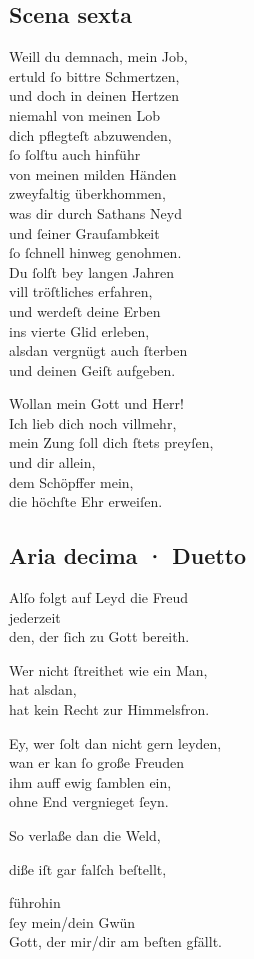 \documentclass{ees}
\newenvironment{lyrics}[1]{%
  \subsection{#1}\nopagebreak%
  \begin{lyricslist}%
  \let\voice\item%
}{%
  \end{lyricslist}%
}
\begin{document}
\begin{lyrics}{Scena sexta}
  \voice[Schöpffer]
  Weill du demnach, mein Job,\\
  ertuld ſo bittre Schmertzen,\\
  und doch in deinen Hertzen\\
  niemahl von meinen Lob\\
  dich pflegteſt abzuwenden,\\
  ſo ſolſtu auch hinführ\\
  von meinen milden Händen\\
  zweyfaltig überkhommen,\\
  was dir durch Sathans Neyd\\
  und ſeiner Grauſambkeit\\
  ſo ſchnell hinweg genohmen.\\
  Du ſolſt bey langen Jahren\\
  vill tröſtliches erfahren,\\
  und werdeſt deine Erben\\
  ins vierte Glid erleben,\\
  alsdan vergnügt auch ſterben\\
  und deinen Geiſt aufgeben.

  \voice[Job]
  Wollan mein Gott und Herr!\\
  Ich lieb dich noch villmehr,\\
  mein Zung ſoll dich ſtets preyſen,\\
  und dir allein,\\
  dem Schöpffer mein,\\
  die höchſte Ehr erweiſen.
\end{lyrics}

\begin{lyrics}{Aria decima · Duetto}
  \voice[Job]
  Alſo folgt auf Leyd die Freud\\
  jederzeit\\
  den, der ſich zu Gott bereith.

  \voice[Schöpffer]
  Wer nicht ſtreithet wie ein Man,\\
  hat alsdan,\\
  hat kein Recht zur Himmelsfron.

  \voice[beyde]
  Ey, wer ſolt dan nicht gern leyden,\\
  wan er kan ſo große Freuden\\
  ihm auff ewig ſamblen ein,\\
  ohne End vergnieget ſeyn.

  \voice[Schöpffer]
  So verlaße dan die Weld,

  \voice[Job]
  diße iſt gar falſch beſtellt,

  \voice[beyde]
  führohin\\
  ſey mein/dein Gwün\\
  Gott, der mir/dir am beſten gfällt.
\end{lyrics}
\end{document}
